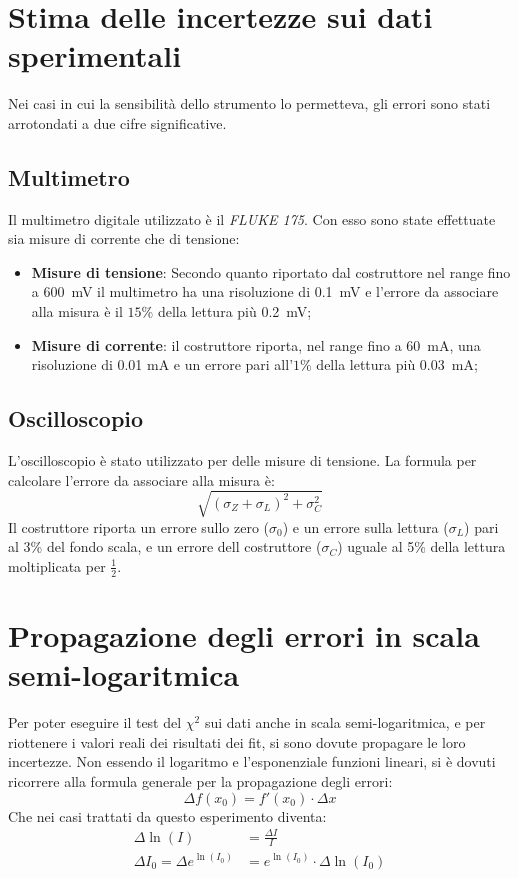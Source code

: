 \documentclass[@SRC@/main]{subfiles}
\begin{document}
\section{Stima delle incertezze sui dati sperimentali}
  \label{sec:stima-delle-incertezze-sui-dati-sperimentali}
  Nei casi in cui la sensibilità dello strumento lo permetteva, gli errori sono
  stati arrotondati a due cifre significative.
  \subsection*{Multimetro}
    Il multimetro digitale utilizzato è il \textit{FLUKE 175}.
    Con esso sono state effettuate sia misure di corrente che di tensione:
    \begin{itemize}
      \item \textbf{Misure di tensione}: Secondo quanto riportato dal costruttore nel
      range fino a 600~mV il multimetro ha una risoluzione di 0.1~mV e
      l'errore da associare alla misura è il $15\%$ della lettura più 0.2~mV;
      \item \textbf{Misure di corrente}: il costruttore riporta, nel range fino a
      60~mA, una risoluzione di 0.01 mA e un errore pari all'$1\%$ della
      lettura più 0.03~mA;
    \end{itemize}

  \subsection*{Oscilloscopio}
    L'oscilloscopio è stato utilizzato per delle misure di tensione.
    La formula per calcolare l'errore da associare alla misura è:
    \begin{equation*}
      \sqrt {\left( \sigma_Z + \sigma_L  \right)^2 + \sigma_C^2}
    \end{equation*}
    Il costruttore riporta un errore sullo zero ($\sigma_0$) e un
    errore sulla lettura ($\sigma_L$) pari al 3\% del fondo scala, e un
    errore dell costruttore ($\sigma_C$) uguale al 5\% della
    lettura moltiplicata per $\frac{1}{2}$.


\section{Propagazione degli errori in scala semi-logaritmica}
  \label{sec:propagazione-errori-log}

  Per poter eseguire il test del $\chi^2$ sui dati anche in scala
  semi-logaritmica, e per riottenere i valori reali dei risultati
  dei fit, si sono dovute propagare le loro incertezze.
  Non essendo il logaritmo e l'esponenziale funzioni lineari, si è
  dovuti ricorrere alla formula generale per la propagazione degli
  errori:
  \begin{equation*}
    \Delta f(x_0) = f'(x_0) \cdot \Delta x
  \end{equation*}
  Che nei casi trattati da questo esperimento diventa:
  \begin{align*}
    \Delta \ln (I) &= \frac{\Delta I}{I} \\
    \Delta I_0 = \Delta e^{\ln (I_0)} &= e^{\ln (I_0)}
    \cdot \Delta \ln (I_0)
  \end{align*}
\end{document}
